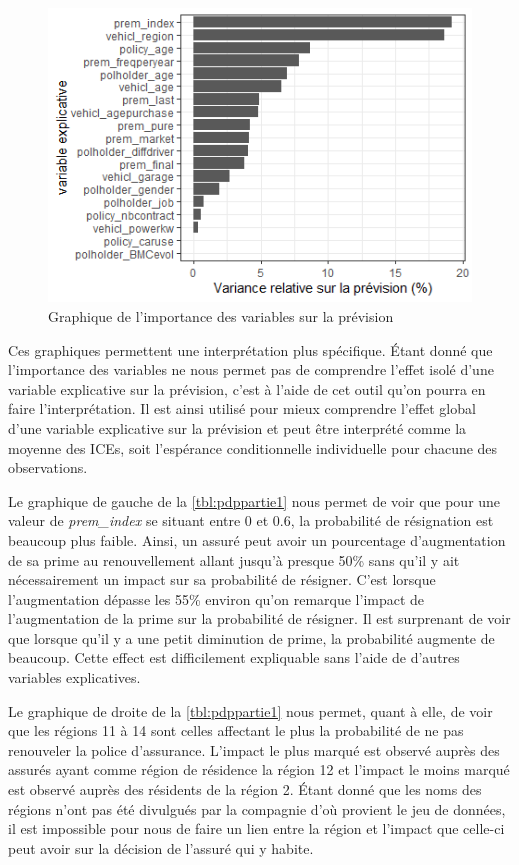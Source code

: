 \documentclass[]{article}
\begin{document}
\begin{figure}
\centering
\includegraphics{../src/07-gbm/imp_gbm}
\caption{Graphique de l'importance des variables sur la prévision}
\label{fig:imp-gbm}
\end{figure}

Ces graphiques permettent une interprétation plus spécifique. Étant
donné que l'importance des variables ne nous permet pas de comprendre
l'effet isolé d'une variable explicative sur la prévision, c'est à
l'aide de cet outil qu'on pourra en faire l'interprétation. Il est ainsi
utilisé pour mieux comprendre l'effet global d'une variable explicative
sur la prévision et peut être interprété comme la moyenne des ICEs, soit
l'espérance conditionnelle individuelle pour chacune des observations.

Le graphique de gauche de la \autoref{tbl:pdppartie1} nous permet de
voir que pour une valeur de \emph{prem\_index} se situant entre 0 et
0.6, la probabilité de résignation est beaucoup plus faible. Ainsi, un
assuré peut avoir un pourcentage d'augmentation de sa prime au
renouvellement allant jusqu'à presque 50\% sans qu'il y ait
nécessairement un impact sur sa probabilité de résigner. C'est lorsque
l'augmentation dépasse les 55\% environ qu'on remarque l'impact de
l'augmentation de la prime sur la probabilité de résigner. Il est
surprenant de voir que lorsque qu'il y a une petit diminution de prime,
la probabilité augmente de beaucoup. Cette effect est difficilement
expliquable sans l'aide de d'autres variables explicatives.

Le graphique de droite de la \autoref{tbl:pdppartie1} nous permet, quant
à elle, de voir que les régions 11 à 14 sont celles affectant le plus la
probabilité de ne pas renouveler la police d'assurance. L'impact le plus
marqué est observé auprès des assurés ayant comme région de résidence la
région 12 et l'impact le moins marqué est observé auprès des résidents
de la région 2. Étant donné que les noms des régions n'ont pas été
divulgués par la compagnie d'où provient le jeu de données, il est
impossible pour nous de faire un lien entre la région et l'impact que
celle-ci peut avoir sur la décision de l'assuré qui y habite.
\end{document}
